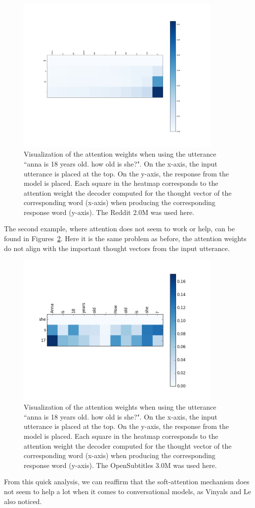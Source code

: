 \begin{figure}[H]
	\centering
	\includegraphics[width=10cm]{img/attention/attention_visualization3_reddit_2m.png}
	\caption{Visualization of the attention weights when using the utterance ``anna is 18 years old. how old is she?". On the x-axis, the input utterance is placed at the top. On the y-axis, the response from the model is placed. Each square in the heatmap corresponds to the attention weight the decoder computed for the thought vector of the corresponding word (x-axis) when producing the corresponding response word (y-axis). The Reddit 2.0M was used here.}
	\label{results:attention:example3:reddit}
\end{figure}

The second example, where attention does not seem to work or help, can be found in Figures~\ref{results:attention:example3:opensubtitles-3M}. Here it is the same problem as before, the attention weights do not align with the important thought vectors from the input utterance.

\begin{figure}[H]
	\centering
	\includegraphics[width=10cm]{img/attention/attention_visualization3_OpenSubtitle-3M.png}
	\caption{Visualization of the attention weights when using the utterance ``anna is 18 years old. how old is she?". On the x-axis, the input utterance is placed at the top. On the y-axis, the response from the model is placed. Each square in the heatmap corresponds to the attention weight the decoder computed for the thought vector of the corresponding word (x-axis) when producing the corresponding response word (y-axis). The OpenSubtitles 3.0M was used here.}
	\label{results:attention:example3:opensubtitles-3M}
\end{figure}

From this quick analysis, we can reaffirm that the soft-attention mechanism does not seem to help a lot when it comes to conversational models, as Vinyals and Le also noticed.


